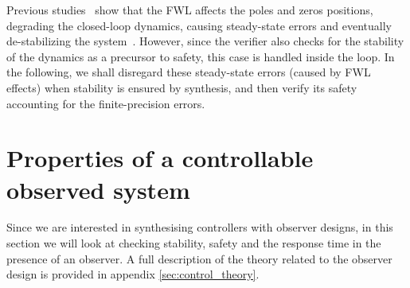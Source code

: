 \documentclass[sigconf]{llncs}
\begin{document}
Previous studies~\cite{gangli1} show that the FWL affects the poles and
zeros positions, degrading the closed-loop dynamics, causing steady-state
errors and eventually de-stabilizing the system~\cite{Bessa16}.  However,
since the verifier also checks for the stability of the dynamics as a
precursor to safety, this case is handled inside the loop.  In the
following, we shall disregard these steady-state errors (caused by FWL
effects) when stability is ensured by synthesis, and then verify its safety
accounting for the finite-precision errors.





\section{Properties of a controllable observed system}\label{sec:cof_verification}

Since we are interested in synthesising controllers with observer
designs, in this section we will look at checking stability, safety
and the response time in the presence of an observer. A full description of
the theory related to the observer design is provided in appendix \ref{sec:control_theory}.
\end{document}
